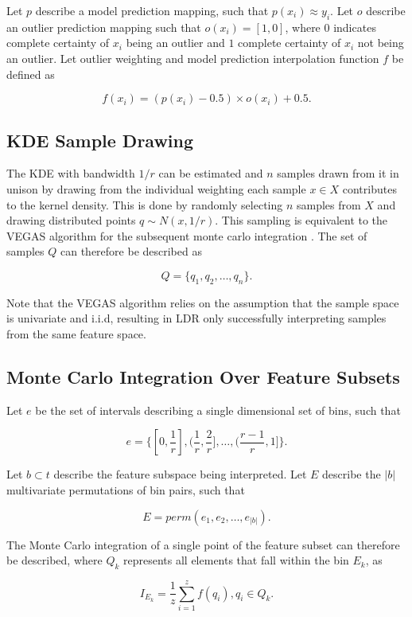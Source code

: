 \documentclass[a4paper, oneside, twocolumn]{article}
\begin{document}
Let $p$ describe a model prediction mapping, such that $p(x_i) \approx y_i$. Let $o$ describe an outlier prediction mapping such that $o(x_i) = [1, 0]$, where $0$ indicates complete certainty of $x_i$ being an outlier and $1$ complete certainty of $x_i$ not being an outlier. Let outlier weighting and model prediction interpolation function $f$ be defined as

$$f(x_i) = (p(x_i) - 0.5) \times o(x_i) + 0.5.$$

\subsection{KDE Sample Drawing}

The KDE with bandwidth $1/r$ can be estimated and $n$ samples drawn from it in unison by drawing from the individual weighting each sample $x \in X$ contributes to the kernel density. This is done by randomly selecting $n$ samples from $X$ and drawing distributed points $q \sim N(x, 1/r)$. This sampling is equivalent to the VEGAS algorithm for the subsequent monte carlo integration \cite{lepage1978new}. The set of samples $Q$ can therefore be described as

$$Q = \{q_1, q_2, \ldots, q_n\}.$$

Note that the VEGAS algorithm relies on the assumption that the sample space is univariate and i.i.d, resulting in LDR only successfully interpreting samples from the same feature space.

\subsection{Monte Carlo Integration Over Feature Subsets}

Let $e$ be the set of intervals describing a single dimensional set of bins, such that

$$e = \{[0, \frac{1}{r}], (\frac{1}{r}, \frac{2}{r}], \ldots, (\frac{r-1}{r}, 1]\}.$$

Let $b \subset t$ describe the feature subspace being interpreted. Let $E$ describe the $|b|$ multivariate permutations of bin pairs, such that

$$E = perm(e_1, e_2, \ldots, e_{|b|}).$$

The Monte Carlo integration of a single point of the feature subset can therefore be described, where $Q_k$ represents all elements that fall within the bin $E_k$, as

$$I_{E_k} = \frac{1}{z} \sum^z_{i=1} f(q_i), q_i \in Q_k.$$
\end{document}
